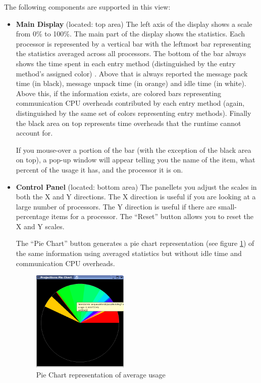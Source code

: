 \documentclass[10pt]{report}
\begin{document}
The following components are supported in this view:

\begin{itemize}
\item[1)] 
{\bf Main Display} (located: top area) 
The left axis of the display shows a scale from 0\% to 100\%.  The
main part of the display shows the statistics.  Each processor is
represented by a vertical bar with the leftmost bar representing the
statistics averaged across all processors. The bottom of the bar
always shows the time spent in each entry method (distinguished by the
entry method's assigned color) . Above that is always reported the
message pack time (in black), message unpack time (in orange) and idle
time (in white). Above this, if the information exists, are colored
bars representing communication CPU overheads contributed by each
entry method (again, distinguished by the same set of colors
representing entry methods). Finally the black area on top represents
time overheads that the \charmpp{} runtime cannot account for.

If you mouse-over a portion of the bar (with the exception of the
black area on top), a pop-up window will appear telling you the name
of the item, what percent of the usage it has, and the processor it is
on.

\item[2)]
{\bf Control Panel} (located: bottom area)
The panellets you adjust the scales in both the X and Y directions.
The X direction is useful if you are looking at a large number of
processors. The Y direction is useful if there are small-percentage
items for a processor. The ``Reset'' button allows you to reset the 
X and Y scales.

The ``Pie Chart'' button generates a pie chart representation (see
figure \ref{piechart}) of the same information using averaged
statistics but without idle time and communication CPU overheads.

\begin{figure}[htb]
\center
\includegraphics[width=1.8in]{fig/piechart}
\caption{Pie Chart representation of average usage}
\label{piechart}
\end{figure}


\end{itemize}
\end{document}

